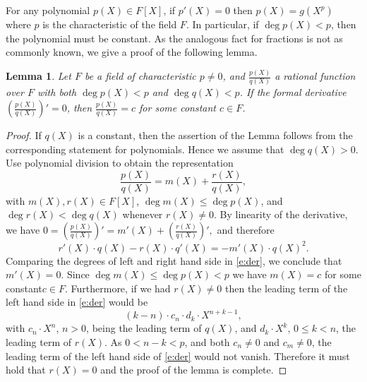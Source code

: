 \documentclass[11pt]{article}
\newtheorem{lem}[]{Lemma}
\theoremstyle{definition}
\theoremstyle{remark}
\begin{document}
For any polynomial $p(X)\in F[X]$, if $p'(X)=0$ then $p(X)= g(X^p)$ where $p$ is the characteristic of the field $F$.
In particular, if $\deg p(X) < p$, then the polynomial must be constant.
As the analogous fact for fractions is not as commonly known, we give a proof of the following lemma.

\begin{lem}
\label{lem:DerivativeFraction}
Let  $F$ be a field of characteristic $p\neq 0$, and $\frac{p(X)}{q(X)}$ a rational function over $F$ with both  $\deg p(X) < p$ and $\deg q(X) < p$.
If the formal derivative $\left(\frac{p(X)}{q(X)}\right)' = 0$, then $\frac{p(X)}{q(X)} = c$ for some constant $c\in F$.
\end{lem}

\begin{proof}
If $q(X)$ is a constant, then the assertion of the Lemma follows from the corresponding statement for polynomials.
Hence we assume that $\deg q(X)>0$.
Use polynomial division to obtain the representation
\[
\frac{p(X)}{q(X)} = m(X) + \frac{r(X)}{q(X)},
\]
with $m(X), r(X) \in F[X]$, $\deg m(X) \leq \deg p(X)$, and $\deg r(X) < \deg q(X)$ whenever $r(X)\neq 0$.
By linearity of the derivative, we have
$
0 =  \left(\frac{p(X)}{q(X)}\right)' = m'(X) + \left(\frac{r(X)}{q(X)}\right)',
$
and therefore
\begin{equation}
\label{e:der}
r'(X)\cdot q(X) - r(X)\cdot q'(X) = - m'(X)\cdot q(X)^2.
\end{equation}
Comparing the degrees of left and right hand side in \eqref{e:der}, we conclude that  $m'(X) = 0$.
Since $\deg m(X) \leq  \deg p(X) < p$ we have $m(X)= c$ for some constant\footnotemark $c\in F$. 
% 
Furthermore, if we had $r(X)\neq 0$ then the leading term of the left hand side in \eqref{e:der} would be
\[
(k - n) \cdot c_n\cdot d_{k} \cdot X^{n + k - 1},
\]
with $c_n \cdot X^n$, $n>0$, being the leading term of $q(X)$, and  $d_k \cdot X^k$, $0\leq k < n$, the leading term of $r(X)$.
As  $0 < n - k < p$, and both $c_n\neq 0$ and $c_m\neq 0$, the leading term of the left hand side of \eqref{e:der} would not vanish.
Therefore it must hold that  $r(X) = 0$ and the proof of the lemma is complete.
\end{proof}
\end{document}

